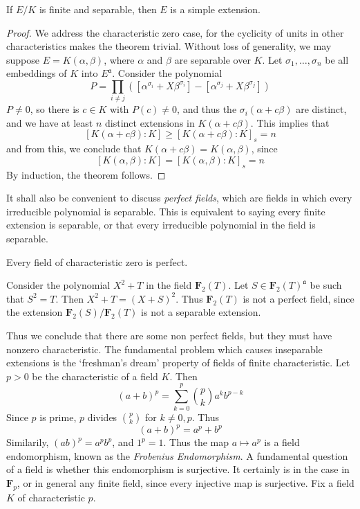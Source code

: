 \begin{corollary}
    If $E/K$ is finite and separable, then $E$ is a simple extension.
\end{corollary}
\begin{proof}
    We address the characteristic zero case, for the cyclicity of units in other characteristics makes the theorem trivial. Without loss of generality, we may suppose $E = K(\alpha, \beta)$, where $\alpha$ and $\beta$ are separable over $K$. Let $\sigma_1, \dots, \sigma_n$ be all embeddings of $K$ into $E^{\mathfrak{a}}$. Consider the polynomial
    \[ P = \prod_{i \neq j} ([\alpha^{\sigma_i} + X \beta^{\sigma_i}] - [\alpha^{\sigma_j} + X \beta^{\sigma_j}]) \]
    $P \neq 0$, so there is $c \in K$ with $P(c) \neq 0$, and thus the $\sigma_i(\alpha + c \beta)$ are distinct, and we have at least     $n$ distinct extensions in $K(\alpha + c \beta)$. This implies that
    \[ [K(\alpha + c \beta): K] \geq [K(\alpha + c \beta): K]_s = n \]
    and from this, we conclude that $K(\alpha + c \beta) = K(\alpha, \beta)$, since
    \[ [K(\alpha, \beta) : K] = [K(\alpha, \beta): K]_s = n \]
    By induction, the theorem follows.
\end{proof}

It shall also be convenient to discuss \emph{perfect fields}, which are fields in which every irreducible polynomial is separable. This is equivalent to saying every finite extension is separable, or that every irreducible polynomial in the field is separable.

\begin{example}
    Every field of characteristic zero is perfect.
\end{example}

\begin{example}
    Consider the polynomial $X^2 + T$ in the field $\mathbf{F}_2(T)$. Let $S \in \mathbf{F}_2(T)^{\mathfrak{a}}$ be such that $S^2 = T$. Then $X^2 + T = (X + S)^2$. Thus $\mathbf{F}_2(T)$ is not a perfect field, since the extension $\mathbf{F}_2(S) / \mathbf{F}_2(T)$ is not a separable extension.
\end{example}

Thus we conclude that there are some non perfect fields, but they must have nonzero characteristic. The fundamental problem which causes inseparable extensions is the `freshman's dream' property of fields of finite characteristic. Let $p > 0$ be the characteristic of a field $K$. Then
%
\[ (a + b)^p = \sum_{k = 0}^p \binom{p}{k} a^kb^{p-k} \]
%
Since $p$ is prime, $p$ divides $\binom{p}{k}$ for $k \neq 0, p$. Thus
%
\[ (a + b)^p = a^p + b^p \]
%
Similarily, $(ab)^p = a^pb^p$, and $1^p = 1$. Thus the map $a \mapsto a^p$ is a field endomorphism, known as the \emph{Frobenius Endomorphism}. A fundamental question of a field is whether this endomorphism is surjective. It certainly is in the case in $\mathbf{F}_p$, or in general any finite field, since every injective map is surjective. Fix a field $K$ of characteristic $p$.

